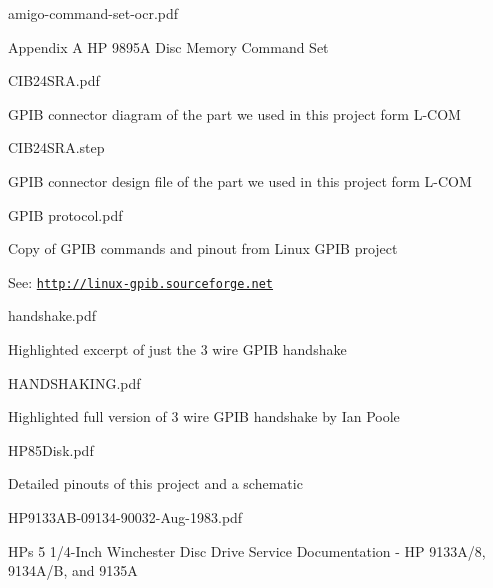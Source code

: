 \begin{DoxyItemize}
\begin{DoxyItemize}
\item amigo-\/command-\/set-\/ocr.\+pdf
\begin{DoxyItemize}
\item Appendix A HP 9895A Disc Memory Command Set
\end{DoxyItemize}
\item C\+I\+B24\+S\+R\+A.\+pdf
\begin{DoxyItemize}
\item G\+P\+IB connector diagram of the part we used in this project form L-\/\+C\+OM
\end{DoxyItemize}
\item C\+I\+B24\+S\+R\+A.\+step
\begin{DoxyItemize}
\item G\+P\+IB connector design file of the part we used in this project form L-\/\+C\+OM
\end{DoxyItemize}
\item G\+P\+IB protocol.\+pdf
\begin{DoxyItemize}
\item Copy of G\+P\+IB commands and pinout from Linux G\+P\+IB project
\item See\+: \href{http://linux-gpib.sourceforge.net}{\tt http\+://linux-\/gpib.\+sourceforge.\+net}
\end{DoxyItemize}
\item handshake.\+pdf
\begin{DoxyItemize}
\item Highlighted excerpt of just the 3 wire G\+P\+IB handshake
\end{DoxyItemize}
\item H\+A\+N\+D\+S\+H\+A\+K\+I\+N\+G.\+pdf
\begin{DoxyItemize}
\item Highlighted full version of 3 wire G\+P\+IB handshake by Ian Poole
\end{DoxyItemize}
\item H\+P85\+Disk.\+pdf
\begin{DoxyItemize}
\item Detailed pinouts of this project and a schematic
\end{DoxyItemize}
\item H\+P9133\+A\+B-\/09134-\/90032-\/\+Aug-\/1983.\+pdf
\begin{DoxyItemize}
\item H\+Ps 5 1/4-\/\+Inch Winchester Disc Drive Service Documentation -\/ HP 9133\+A/8, 9134\+A/B, and 9135A
\end{DoxyItemize}

\end{DoxyItemize}
\end{DoxyItemize}
